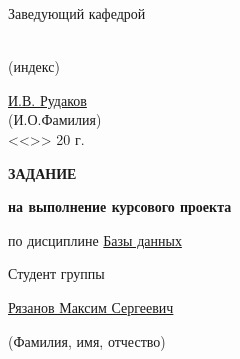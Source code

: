 \begin{titlepage}
\begin{adjustbox}{minipage=0.4\textwidth,valign=T,right}
    \begin{adjustbox}{minipage=0.7\textwidth}
        Заведующий кафедрой
    \end{adjustbox}
    \begin{adjustbox}{minipage=0.25\textwidth}
        \uline{\hfill}
    \end{adjustbox}\\
    \begin{adjustbox}{minipage=0.25\textwidth, right}
        \scriptsize
        \vspace{-1em}
        (индекс)
    \end{adjustbox}\\
    \begin{adjustbox}{minipage=0.4\textwidth}
        \vspace{.7em}
        \uline{\hfill}
    \end{adjustbox}
    \begin{adjustbox}{minipage=0.55\textwidth}
        \uline{\hfill И.В. Рудаков\hfill}
    \end{adjustbox}\\
    \begin{adjustbox}{minipage=0.45\textwidth, right}
        \scriptsize
        \vspace{-0.6em}
        (И.О.Фамилия)
    \end{adjustbox}\\
    \begin{adjustbox}{minipage=\textwidth, center}
        <<\uline{\hfill}>>\uline{\hfill\hfill\hfill} 20\uline{\hfill} г.
    \end{adjustbox}

\end{adjustbox}

\bigskip

\begin{center}
    \LARGE\textbf{ЗАДАНИЕ}

    \large\textbf{на выполнение курсового проекта}
    \small

    по дисциплине
    \uline{\hfill
        Базы данных
    \hfill}

    Студент группы
    \uline{\hfill
        \wgroup
    \hfill}

    {\singlespacing
    \uline{\hfill
        Рязанов 
        Максим 
        Сергеевич
    \hfill}

    {\scriptsize\vspace{-0.3em}(Фамилия, имя, отчество)}
    }

    \vspace{1em}


\end{center}
\end{titlepage}
